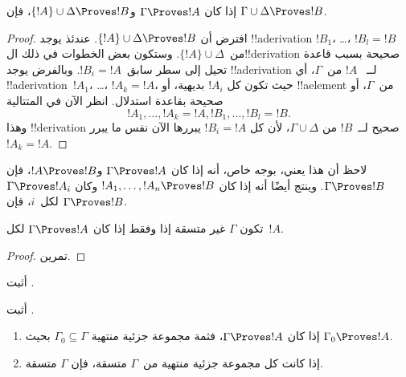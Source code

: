 \documentclass[../../../include/open-logic-section]{subfiles}
\begin{document}
\begin{prop}[التعدية]
إذا كان $\Gamma \Proves !A$ و$\{!A\} \cup \Delta \Proves
!B$، فإن $\Gamma \cup \Delta \Proves !B$.
\end{prop}

\begin{proof}
  افترض أن $\{!A\} \cup \Delta \Proves !B$. عندئذ يوجد
  !!a{derivation} $!B_1$، \dots، $!B_l = !B$ من~$\{!A\} \cup
  \Delta$. وستكون بعض الخطوات في ذلك ال!!{derivation} صحيحة بسبب قاعدة
  تحيل إلى سطر سابق~$!B_i = !A$. وبالفرض يوجد !!a{derivation} لــ
  ~$!A$ من~$\Gamma$، أي !!a{derivation}~$!A_1$، \dots، $!A_k = !A$،
  حيث تكون كل $!A_i$ بديهية، أو !!a{element} من~$\Gamma$، أو صحيحة
  بقاعدة استدلال. انظر الآن في المتتالية
  \[
  !A_1, \dots, !A_k = !A, !B_1, \dots, !B_l = !B.
  \]
  وهذا !!{derivation} صحيح لــ~$!B$ من $\Gamma \cup \Delta$، لأن كل
  $!B_i = !A$ يبررها الآن نفس ما يبرر~$!A_k = !A$.
\end{proof}

لاحظ أن هذا يعني، بوجه خاص، أنه إذا كان $\Gamma \Proves !A$ و$!A
\Proves !B$، فإن $\Gamma \Proves !B$. وينتج أيضًا أنه إذا كان $!A_1,
\dots, !A_n \Proves !B$ وكان $\Gamma \Proves !A_i$ لكل~$i$، فإن
$\Gamma \Proves !B$.

\begin{prop}
تكون $\Gamma$ غير متسقة إذا وفقط إذا كان $\Gamma \Proves !A$ لكل~$!A$.
\end{prop}

\begin{proof}
تمرين.
\end{proof}

\begin{prob}
أثبت .
\end{prob}
\tagendprob

\begin{prob}
أثبت .
\end{prob}
\tagendprob

\begin{prop}[التراص]
  \begin{enumerate}
  \item إذا كان $\Gamma \Proves !A$، فثمة مجموعة جزئية منتهية $\Gamma_0
    \subseteq \Gamma$ بحيث $\Gamma_0 \Proves !A$.
  \item إذا كانت كل مجموعة جزئية منتهية من~$\Gamma$ متسقة، فإن
    $\Gamma$ متسقة.
  \end{enumerate}
\end{prop}
\end{document}
